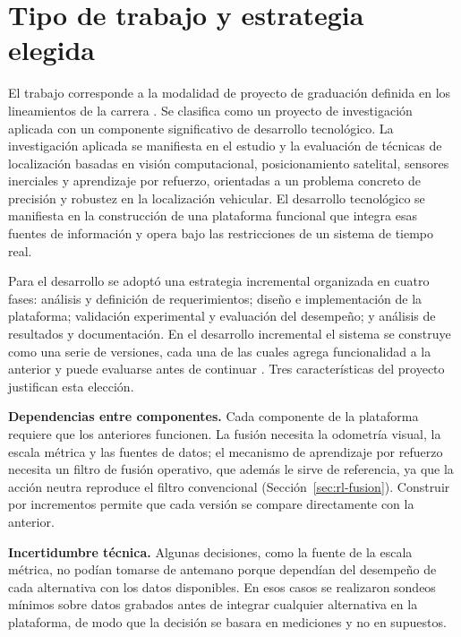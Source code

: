 \section{Tipo de trabajo y estrategia elegida}
\label{sec:met-estrategia}

El trabajo corresponde a la modalidad de proyecto de graduación definida en los lineamientos de la carrera \cite{tec_lineamientos_tfg}.
Se clasifica como un proyecto de investigación aplicada con un componente significativo de desarrollo tecnológico.
La investigación aplicada se manifiesta en el estudio y la evaluación de técnicas de localización basadas en visión computacional, posicionamiento satelital, sensores inerciales y aprendizaje por refuerzo, orientadas a un problema concreto de precisión y robustez en la localización vehicular.
El desarrollo tecnológico se manifiesta en la construcción de una plataforma funcional que integra esas fuentes de información y opera bajo las restricciones de un sistema de tiempo real.

Para el desarrollo se adoptó una estrategia incremental organizada en cuatro fases: análisis y definición de requerimientos; diseño e implementación de la plataforma; validación experimental y evaluación del desempeño; y análisis de resultados y documentación.
En el desarrollo incremental el sistema se construye como una serie de versiones, cada una de las cuales agrega funcionalidad a la anterior y puede evaluarse antes de continuar \cite{sommerville2016software}.
Tres características del proyecto justifican esta elección.

\textbf{Dependencias entre componentes.}
Cada componente de la plataforma requiere que los anteriores funcionen.
La fusión necesita la odometría visual, la escala métrica y las fuentes de datos; el mecanismo de aprendizaje por refuerzo necesita un filtro de fusión operativo, que además le sirve de referencia, ya que la acción neutra reproduce el filtro convencional (Sección~\ref{sec:rl-fusion}).
Construir por incrementos permite que cada versión se compare directamente con la anterior.

\textbf{Incertidumbre técnica.}
Algunas decisiones, como la fuente de la escala métrica, no podían tomarse de antemano porque dependían del desempeño de cada alternativa con los datos disponibles.
En esos casos se realizaron sondeos mínimos sobre datos grabados antes de integrar cualquier alternativa en la plataforma, de modo que la decisión se basara en mediciones y no en supuestos.

